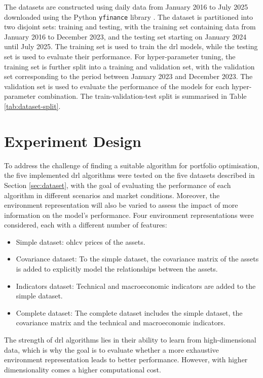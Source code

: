 The datasets are constructed using daily data from January 2016 to July 2025 downloaded using the Python \texttt{yfinance} library \cite{yfinance}. The dataset is partitioned into two disjoint sets: training and testing, with the training set containing data from January 2016 to December 2023, and the testing set starting on January 2024 until July 2025. The training set is used to train the \acrshort{drl} models, while the testing set is used to evaluate their performance. For hyper-parameter tuning, the training set is further split into a training and validation set, with the validation set corresponding to the period between January 2023 and December 2023. The validation set is used to evaluate the performance of the models for each hyper-parameter combination. The train-validation-test split is summarised in Table \ref{tab:dataset-split}.



\section{Experiment Design} \label{sec:experiment-design}

To address the challenge of finding a suitable algorithm for portfolio optimisation, the five implemented \acrshort{drl} algorithms were tested on the five datasets described in Section \ref{sec:dataset}, with the goal of evaluating the performance of each algorithm in different scenarios and market conditions. Moreover, the environment representation will also be varied to assess the impact of more information on the model's performance. Four environment representations were considered, each with a different number of features:
\begin{itemize}
    \item Simple dataset: \acrfull{ohlcv} prices of the assets.
    \item Covariance dataset: To the simple dataset, the covariance matrix of the assets is added to explicitly model the relationships between the assets.
    \item Indicators dataset: Technical and macroeconomic indicators are added to the simple dataset.
    \item Complete dataset: The complete dataset includes the simple dataset, the covariance matrix and the technical and macroeconomic indicators.
\end{itemize}

The strength of \acrshort{drl} algorithms lies in their ability to learn from high-dimensional data, which is why the goal is to evaluate whether a more exhaustive environment representation leads to better performance. However, with higher dimensionality comes a higher computational cost.

